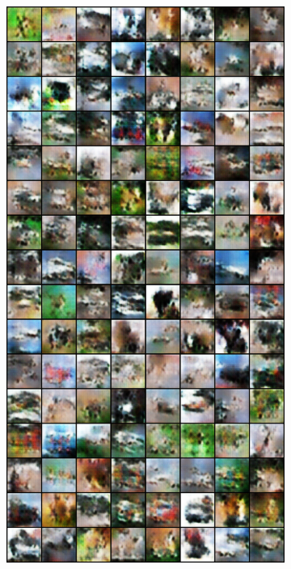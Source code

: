 \begin{figure}[H]
\begin{subfigure}{0.2\textwidth}
    \end{subfigure}%
    \begin{subfigure}{0.2\textwidth}
        \centering
        \includegraphics[width=0.95\linewidth]{cifar10/64/fake_sample_epoch_0010.png}
        \caption{}
        \label{subfig:cifar10/64/fake_sample_epoch_0010}
    \end{subfigure}%

\end{figure}
